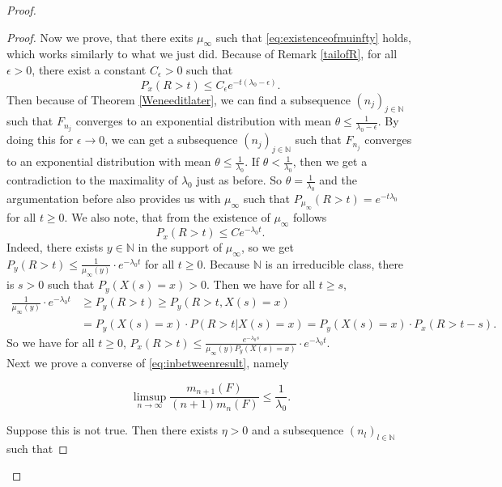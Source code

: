 \documentclass[12pt,a4paper]{scrartcl}
\numberwithin{equation}{section}
\newcommand{\N}{\mathbb{N}} %
\begin{document}
\begin{proof}
\begin{proof}
Now we prove, that there exits $ \mu_{\infty} $ such that \eqref{eq:existenceofmuinfty} holds, which works similarly to what we just did. Because of Remark \ref{tailofR}, for all $ \epsilon > 0 $, there exist a constant $ C_{\epsilon} > 0$ such that
$$ P_x\left(R > t \right) \leq C_{\epsilon} e^{-t\left(\lambda_0 - \epsilon \right)}. $$
Then because of Theorem \ref{Weneeditlater}, we can find a subsequence $\left(n_j\right)_{j \in \N}$ such that $ F_{n_j} $ converges to an exponential distribution with mean $\theta \leq \frac{1}{\lambda_0-\epsilon} $. By doing this for $ \epsilon \to 0 $, we can get a subsequence $\left(n_j\right)_{j \in \N}$ such that $ F_{n_j} $ converges to an exponential distribution with mean $\theta \leq \frac{1}{\lambda_0} $. If $ \theta < \frac{1}{\lambda_0} $, then we get a contradiction to the maximality of $ \lambda_0 $ just as before. So $\theta = \frac{1}{\lambda_0}$ and the argumentation before also provides us with $ \mu_{\infty} $ such that $P_{\mu_{\infty}}\left(R > t\right) = e^{-t \lambda_0}$ for all $t \geq 0$. We also note, that from the existence of $ \mu_{\infty} $ follows
$$ P_x\left(R > t\right) \leq Ce^{-\lambda_0 t} .$$  Indeed, there exists $ y \in \N$ in the support of $\mu_{\infty}$, so we get $P_y\left(R > t\right) \leq \frac{1}{\mu_{\infty}\left(y\right)} \cdot e^{-\lambda_0 t}$ for all $ t\geq 0$. Because $\N$ is an irreducible class, there is $s > 0$ such that $P_y\left(X\left(s\right) = x\right) > 0$. Then we have for all $ t \geq s$,
\begin{align*}
\frac{1}{\mu_{\infty}\left(y\right)} \cdot e^{-\lambda_0 t} &\geq P_y\left(R > t\right) \geq P_y\left(R > t, X\left(s\right) = x\right) \\
&= P_y\left(X\left(s\right) = x\right) \cdot P\left(R > t| X\left(s\right) = x\right) = P_y\left(X\left(s\right) = x\right) \cdot P_x\left(R > t-s\right).
\end{align*}
So we have for all $ t \geq 0 $, $P_x\left(R > t\right) \leq \frac{e^{-\lambda_0 s}}{\mu_{\infty}\left(y\right) P_y\left(X\left(s\right) = x\right) }\cdot e^{-\lambda_0 t}$. \\[2ex]


Next we prove a converse of \eqref{eq:inbetweenresult}, namely

\begin{equation}
\limsup_{n \to \infty} \frac{m_{n+1}\left(F\right)}{\left(n+1\right) m_n\left(F\right)} \leq \frac{1}{\lambda_0}.
\end{equation}

Suppose this is not true. Then there exists $\eta > 0$ and a subsequence $ \left(n_l\right)_{l \in \N} $ such that


\end{proof}
\end{proof}
\end{document}
